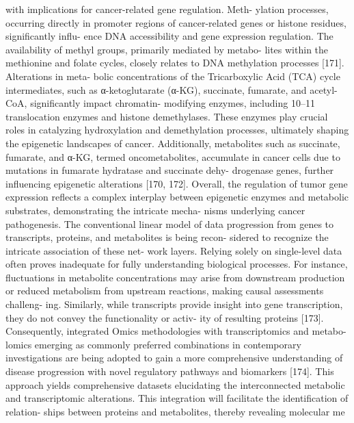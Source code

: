 with implications for cancer-related gene regulation. Meth-
ylation processes, occurring directly in promoter regions of
cancer-related genes or histone residues, significantly influ-
ence DNA accessibility and gene expression regulation. The
availability of methyl groups, primarily mediated by metabo-
lites within the methionine and folate cycles, closely relates
to DNA methylation processes [171]. Alterations in meta-
bolic concentrations of the Tricarboxylic Acid (TCA) cycle
intermediates, such as α-ketoglutarate (α-KG), succinate,
fumarate, and acetyl-CoA, significantly impact chromatin-
modifying enzymes, including 10–11 translocation enzymes
and histone demethylases. These enzymes play crucial roles
in catalyzing hydroxylation and demethylation processes,
ultimately shaping the epigenetic landscapes of cancer.
Additionally, metabolites such as succinate, fumarate, and
α-KG, termed oncometabolites, accumulate in cancer cells
due to mutations in fumarate hydratase and succinate dehy-
drogenase genes, further influencing epigenetic alterations
[170, 172]. Overall, the regulation of tumor gene expression
reflects a complex interplay between epigenetic enzymes and
metabolic substrates, demonstrating the intricate mecha-
nisms underlying cancer pathogenesis.
The conventional linear model of data progression from
genes to transcripts, proteins, and metabolites is being recon-
sidered to recognize the intricate association of these net-
work layers. Relying solely on single-level data often proves
inadequate for fully understanding biological processes. For
instance, fluctuations in metabolite concentrations may arise
from downstream production or reduced metabolism from
upstream reactions, making causal assessments challeng-
ing. Similarly, while transcripts provide insight into gene
transcription, they do not convey the functionality or activ-
ity of resulting proteins [173]. Consequently, integrated
Omics methodologies with transcriptomics and metabo-
lomics emerging as commonly preferred combinations in
contemporary investigations are being adopted to gain a
more comprehensive understanding of disease progression
with novel regulatory pathways and biomarkers [174]. This
approach yields comprehensive datasets elucidating the
interconnected metabolic and transcriptomic alterations.
This integration will facilitate the identification of relation-
ships between proteins and metabolites, thereby revealing
molecular me

